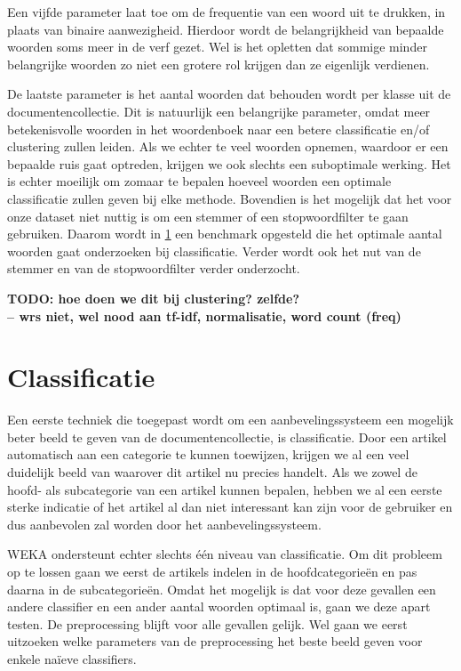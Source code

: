Een vijfde parameter laat toe om de frequentie van een woord uit te drukken, in plaats van binaire aanwezigheid. Hierdoor wordt de belangrijkheid van bepaalde woorden soms meer in de verf gezet. Wel is het opletten dat sommige minder belangrijke woorden zo niet een grotere rol krijgen dan ze eigenlijk verdienen.

De laatste parameter is het aantal woorden dat behouden wordt per klasse uit de documentencollectie. Dit is natuurlijk een belangrijke parameter, omdat meer betekenisvolle woorden in het woordenboek naar een betere classificatie en/of clustering zullen leiden. Als we echter te veel woorden opnemen, waardoor er een bepaalde ruis gaat optreden, krijgen we ook slechts een suboptimale werking. Het is echter moeilijk om zomaar te bepalen hoeveel woorden een optimale classificatie zullen geven bij elke methode. Bovendien is het mogelijk dat het voor onze dataset niet nuttig is om een stemmer of een stopwoordfilter te gaan gebruiken. Daarom wordt in \ref{result-clas} een benchmark opgesteld die het optimale aantal woorden gaat onderzoeken bij classificatie. Verder wordt ook het  nut van de stemmer en van de stopwoordfilter verder onderzocht. 

\textbf{TODO: hoe doen we dit bij clustering? zelfde?\\-- wrs niet, wel nood aan tf-idf, normalisatie, word count (freq)}

\section{Classificatie}\label{result-clas}
Een eerste techniek die toegepast wordt om een aanbevelingssysteem een mogelijk beter beeld te geven van de documentencollectie, is classificatie. Door een artikel automatisch aan een categorie te kunnen toewijzen, krijgen we al een veel duidelijk beeld van waarover dit artikel nu precies handelt. Als we zowel de hoofd- als subcategorie van een artikel kunnen bepalen, hebben we al een eerste sterke indicatie of het artikel al dan niet interessant kan zijn voor de gebruiker en dus aanbevolen zal worden door het aanbevelingssysteem. 

WEKA ondersteunt echter slechts \'e\'en niveau van classificatie. Om dit probleem op te lossen gaan we eerst de artikels indelen in de hoofdcategorie\"en en pas daarna in de subcategorie\"en. Omdat het mogelijk is dat voor deze gevallen een andere classifier en een ander aantal woorden optimaal is, gaan we deze apart testen. De preprocessing blijft voor alle gevallen gelijk. Wel gaan we eerst uitzoeken welke parameters van de preprocessing het beste beeld geven voor enkele na\"ieve classifiers. 

